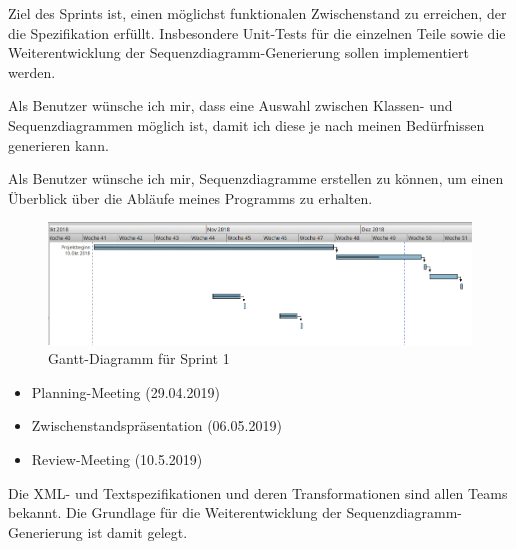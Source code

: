 Ziel des Sprints ist, einen möglichst funktionalen Zwischenstand zu erreichen, der die Spezifikation erfüllt. Insbesondere Unit-Tests für die einzelnen Teile sowie die Weiterentwicklung der Sequenzdiagramm-Generierung sollen implementiert werden.

\nsecend

Als Benutzer wünsche ich mir, dass eine Auswahl zwischen Klassen- und Sequenzdiagrammen möglich ist, damit ich diese je nach meinen Bedürfnissen generieren kann.
\nsecend

Als Benutzer wünsche ich mir, Sequenzdiagramme erstellen zu können, um einen Überblick über die Abläufe meines Programms zu erhalten.
\nsecend
\nsecend%
\nsecend %

\begin{figure}[hbtp]
\centering
\includegraphics[width=\textwidth]{Bilder/gantt}
\caption{Gantt-Diagramm für Sprint 1}
\end{figure}
\nsecend%

\begin{itemize}
\item Planning-Meeting (29.04.2019)
\item Zwischenstandspräsentation (06.05.2019)
\item Review-Meeting (10.5.2019)
\end{itemize}
\nsecend%

Die XML- und Textspezifikationen und deren Transformationen sind allen Teams bekannt. Die Grundlage für die Weiterentwicklung der Sequenzdiagramm-Generierung ist damit gelegt. 
\nsecend

